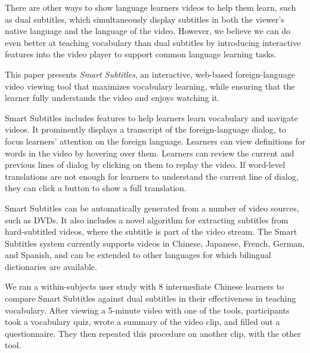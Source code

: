 \documentclass{sigchi}
\begin{document}
There are other ways to show language learners videos to help them learn,
such as dual subtitles,
which simultaneously display subtitles in both the viewer's native
language and the language of the video.
However, we believe we can do even better at teaching vocabulary
than dual subtitles
by introducing interactive features into the video player
to support common language learning tasks.

This paper presents \emph{Smart Subtitles}, an interactive, web-based
foreign-language video viewing tool
that maximizes vocabulary learning, while ensuring that the learner
fully understands the video and enjoys watching it.

Smart Subtitles includes features to help
learners learn vocabulary and navigate videos.
It prominently displays a transcript of the foreign-language dialog, to
focus learners' attention on the foreign language.
Learners can view definitions for words in the video by hovering over them.
Learners can review the current and previous lines of dialog by clicking on them to replay the video.
If word-level translations are not enough for learners to understand the
current line of dialog, they can click a button to show a full translation.

Smart Subtitles can be automatically generated from a number
of video sources, such as DVDs. It also includes a novel algorithm for
extracting subtitles from hard-subtitled videos, where the subtitle is
part of the video stream. The Smart Subtitles system currently supports videos in Chinese,
Japanese, French, German, and Spanish, and can be extended to other languages
for which bilingual dictionaries are available.

We ran a within-subjects user study with 8 intermediate Chinese learners to compare Smart Subtitles against dual subtitles in their effectiveness in teaching vocabulary. After viewing a 5-minute video with one of the tools, participants took a vocabulary quiz,
wrote a summary of the video clip,
and filled out a questionnaire. They then repeated this procedure on another clip, with the other tool.
\end{document}
